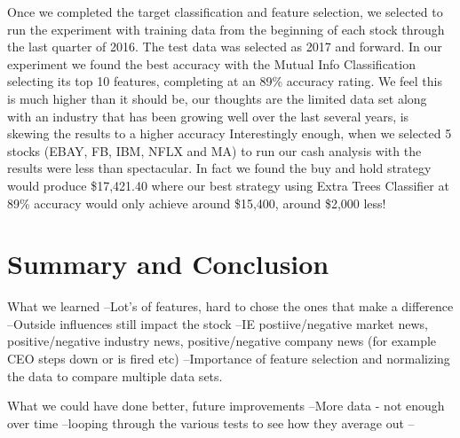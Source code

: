 \documentclass[conference]{IEEEtran}
\begin{document}
Once we completed the target classification and feature selection, we selected to run the experiment with training data from the beginning of each stock through the last quarter of 2016. The test data was selected as 2017 and forward. In our experiment we found the best accuracy with the Mutual Info Classification selecting its top 10 features, completing at an 89\% accuracy rating.  We feel this is much higher than it should be, our thoughts are the limited data set along with an industry that has been growing well over the last several years, is skewing the results to a higher accuracy Interestingly enough, when we selected 5 stocks (EBAY, FB, IBM, NFLX and MA)  to run our cash analysis with the results were less than spectacular.  In fact we found the buy and hold strategy would produce \$17,421.40 where our best strategy using Extra Trees Classifier at 89\% accuracy would only achieve around \$15,400, around \$2,000 less!

\section{Summary and Conclusion}

What we learned
--Lot's of features, hard to chose the ones that make a difference
--Outside influences still impact the stock --IE postiive/negative market news, positive/negative industry news, positive/negative company news (for example CEO steps down or is fired etc)
--Importance of feature selection and normalizing the data to compare multiple data sets.


What we could have done better, future improvements
--More data - not enough over time
--looping through the various tests to see how they average out
--
\end{document}
